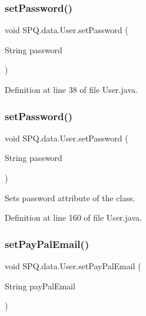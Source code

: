 \subsubsection{\texorpdfstring{set\+Password()}{setPassword()}\hspace{0.1cm}{\footnotesize\ttfamily [3/4]}}
{\footnotesize\ttfamily void S\+P\+Q.\+data.\+User.\+set\+Password (\begin{DoxyParamCaption}\item[{String}]{password }\end{DoxyParamCaption})}



Definition at line 38 of file User.\+java.

\mbox{\label{class_s_p_q_1_1data_1_1_user_aa5bcf362d3c9c4746f406239bcb041f5}} 
\subsubsection{\texorpdfstring{set\+Password()}{setPassword()}\hspace{0.1cm}{\footnotesize\ttfamily [4/4]}}
{\footnotesize\ttfamily void S\+P\+Q.\+data.\+User.\+set\+Password (\begin{DoxyParamCaption}\item[{String}]{password }\end{DoxyParamCaption})}

Sets password attribute of the class. 

Definition at line 160 of file User.\+java.

\mbox{\label{class_s_p_q_1_1data_1_1_user_abe8156eec92d2d94d290b96af8e8ea94}} 
\subsubsection{\texorpdfstring{set\+Pay\+Pal\+Email()}{setPayPalEmail()}}
{\footnotesize\ttfamily void S\+P\+Q.\+data.\+User.\+set\+Pay\+Pal\+Email (\begin{DoxyParamCaption}\item[{String}]{pay\+Pal\+Email }\end{DoxyParamCaption})}

